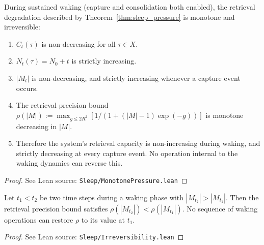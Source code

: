\begin{theorem}
\label{thm:monotone_pressure}
\leanok
{}
During sustained waking (capture and consolidation both enabled), the retrieval degradation described by Theorem~\ref{thm:sleep_pressure} is monotone and irreversible:
\begin{enumerate}
\item $C_t(\tau)$ is non-decreasing for all $\tau \in X$.
\item $N_t(\tau) = N_0 + t$ is strictly increasing.
\item $|M_t|$ is non-decreasing, and strictly increasing whenever a capture event occurs.
\item The retrieval precision bound $\rho(|M|) := \max_{g \leq 2R^2} [1/(1 + (|M|-1)\exp(-g))]$ is monotone decreasing in $|M|$.
\item Therefore the system's retrieval capacity is non-increasing during waking, and strictly decreasing at every capture event. No operation internal to the waking dynamics can reverse this.
\end{enumerate}
\end{theorem}

\begin{proof}
\leanok
{}
See Lean source: \texttt{Sleep/MonotonePressure.lean}
\end{proof}

\begin{corollary}
\label{cor:irreversible}
\leanok
{}
Let $t_1 < t_2$ be two time steps during a waking phase with $|M_{t_2}| > |M_{t_1}|$.  Then the retrieval precision bound satisfies $\rho(|M_{t_2}|) < \rho(|M_{t_1}|)$.  No sequence of waking operations can restore $\rho$ to its value at $t_1$.
\end{corollary}

\begin{proof}
\leanok
{}
See Lean source: \texttt{Sleep/Irreversibility.lean}
\end{proof}

